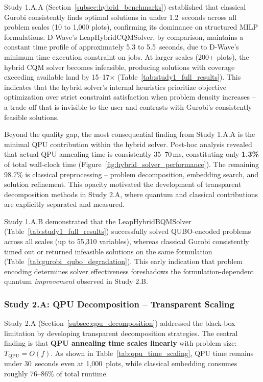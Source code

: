 \documentclass{oqireport}
\begin{document}
Study 1.A.A (Section~\ref{subsec:hybrid_benchmarks}) established that classical Gurobi consistently finds optimal solutions in under 1.2~seconds across all problem scales (10 to 1,000 plots), confirming its dominance on structured MILP formulations. D-Wave's LeapHybridCQMSolver, by comparison, maintains a constant time profile of approximately 5.3 to 5.5~seconds, due to D-Wave's minimum time execution constraint on jobs. At larger scales (200+ plots), the hybrid CQM solver becomes infeasible, producing solutions with coverage exceeding available land by 15--17$\times$ (Table~\ref{tab:study1_full_results}). This indicates that the hybrid solver's internal heuristics prioritize objective optimization over strict constraint satisfaction when problem density increases -- a trade-off that is invisible to the user and contrasts with Gurobi's consistently feasible solutions.

Beyond the quality gap, the most consequential finding from Study 1.A.A is the minimal QPU contribution within the hybrid solver. Post-hoc analysis revealed that actual QPU annealing time is consistently 35--70\,ms, constituting only \textbf{1.3\%} of total wall-clock time (Figure~\ref{fig:hybrid_solver_performance}). The remaining 98.7\% is classical preprocessing -- problem decomposition, embedding search, and solution refinement. This opacity motivated the development of transparent decomposition methods in Study 2.A, where quantum and classical contributions are explicitly separated and measured.

Study 1.A.B demonstrated that the LeapHybridBQMSolver (Table~\ref{tab:study1_full_results}) successfully solved QUBO-encoded problems across all scales (up to 55,310 variables), whereas classical Gurobi consistently timed out or returned infeasible solutions on the same formulation (Table~\ref{tab:gurobi_qubo_degradation}). This early indication that problem encoding determines solver effectiveness foreshadows the formulation-dependent quantum \textit{improvement} observed in Study 2.B.

\subsubsection{Study 2.A: QPU Decomposition -- Transparent Scaling}

Study 2.A (Section~\ref{subsec:qpu_decomposition}) addressed the black-box limitation by developing transparent decomposition strategies. The central finding is that \textbf{QPU annealing time scales linearly} with problem size: $T_{\text{QPU}} = O(f)$. As shown in Table~\ref{tab:qpu_time_scaling}, QPU time remains under 30~seconds even at 1,000~plots, while classical embedding consumes roughly 76--86\% of total runtime.
\end{document}
